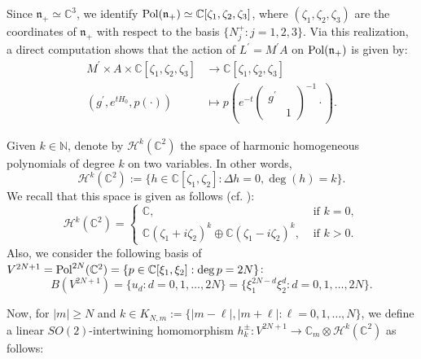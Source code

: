 \documentclass[12pt, pdflatex, a4paper]{article}
\theoremstyle{plain}
\theoremstyle{definition}
\def\C{{\mathbb C}}
\def\Harm{\mathcal{H}}
\def\N{{\mathbb N}}
\def\n{\mathfrak{n}}
\def\Pol{\text{\normalfont{Pol}}}
\begin{document}
Since $\n_+ \simeq \C^3$, we identify $\Pol(\n_+) \simeq \C[\zeta_1, \zeta_2, \zeta_3]$, where $(\zeta_1, \zeta_2, \zeta_3)$ are the coordinates of $\n_+$ with respect to the basis $\{N_j^+: j=1,2,3\}$. Via this realization, a direct computation shows that the action of $L^\prime = M^\prime A$ on $\Pol(\n_+)$ is given by:
\begin{align*}
M^\prime \times A \times \C[\zeta_1, \zeta_2, \zeta_3] &\longrightarrow \C[\zeta_1, \zeta_2, \zeta_3]\\
(g^\prime, e^{tH_0}, p(\cdot)) &\longmapsto p\left(e^{-t}\begin{pmatrix}
g^\prime &\\
& 1
\end{pmatrix}^{-1}
\cdot\right).
\end{align*}

Given $k \in \N$, denote by $\Harm^k(\C^2)$ the space of harmonic homogeneous polynomials of degree $k$ on two variables. In other words,
\begin{equation*}
\Harm^k(\C^2) := \{h\in \C[\zeta_1, \zeta_2] :\Delta h = 0, \deg(h) = k\}.
\end{equation*}
We recall that this space is given as follows (cf. \cite[Thm. 3.1]{He00}):
\begin{equation*}
\Harm^k(\C^2) = \begin{cases}
\C, & \text{ if } k = 0,\\
\C(\zeta_1 + i\zeta_2)^k \oplus \C(\zeta_1 - i\zeta_2)^k, & \text{ if } k > 0.
\end{cases}
\end{equation*}
Also, we consider the following basis of $V^{2N+1} = \Pol^{2N}(\C^2) = \{p \in \C[\xi_1, \xi_2]: \deg p = 2N\}$:
\begin{equation}\label{basis-V2N+1}
B(V^{2N+1}) = \{u_d : d=0, 1, \ldots, 2N\} = \{\xi_1^{2N-d}\xi_2^{d}: d = 0, 1, \ldots, 2N\}.
\end{equation}

Now, for $|m| \geq N$ and $k \in K_{N,m} := \{|m-\ell|, |m+\ell| : \ell = 0, 1, \ldots, N\}$, we define a linear $SO(2)$-intertwining homomorphism $h_{k}^\pm: V^{2N+1}\rightarrow\C_{m} \otimes \Harm^k(\C^2)$
as follows: 
\end{document}
